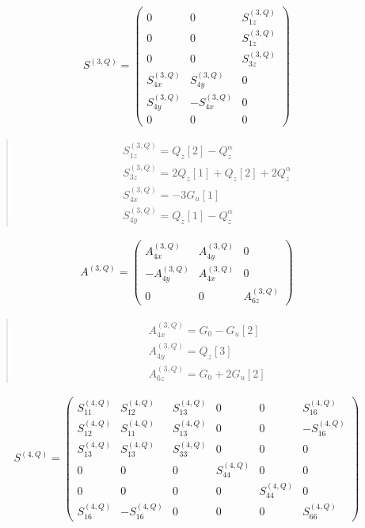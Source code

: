 \documentclass[fleqn,10pt]{jsarticle}
\begin{document}
\begin{align*}
S^{(3,Q)} = \begin{pmatrix} 0 & 0 & S^{(3,Q)}_{1z} \\ 0 & 0 & S^{(3,Q)}_{1z} \\ 0 & 0 & S^{(3,Q)}_{3z} \\ S^{(3,Q)}_{4x} & S^{(3,Q)}_{4y} & 0 \\ S^{(3,Q)}_{4y} & - S^{(3,Q)}_{4x} & 0 \\ 0 & 0 & 0 \end{pmatrix}
\end{align*}
\begin{quote}
\begin{align*}
& S^{(3,Q)}_{1z} = Q_{z}[2] - Q_{z}^{\alpha} \\
& S^{(3,Q)}_{3z} = 2 Q_{z}[1] + Q_{z}[2] + 2 Q_{z}^{\alpha} \\
& S^{(3,Q)}_{4x} = - 3 G_{u}[1] \\
& S^{(3,Q)}_{4y} = Q_{z}[1] - Q_{z}^{\alpha}
\end{align*}
\end{quote}
\begin{align*}
A^{(3,Q)} = \begin{pmatrix} A^{(3,Q)}_{4x} & A^{(3,Q)}_{4y} & 0 \\ - A^{(3,Q)}_{4y} & A^{(3,Q)}_{4x} & 0 \\ 0 & 0 & A^{(3,Q)}_{6z} \end{pmatrix}
\end{align*}
\begin{quote}
\begin{align*}
& A^{(3,Q)}_{4x} = G_{0} - G_{u}[2] \\
& A^{(3,Q)}_{4y} = Q_{z}[3] \\
& A^{(3,Q)}_{6z} = G_{0} + 2 G_{u}[2]
\end{align*}
\end{quote}
\begin{align*}
S^{(4,Q)} = \begin{pmatrix} S^{(4,Q)}_{11} & S^{(4,Q)}_{12} & S^{(4,Q)}_{13} & 0 & 0 & S^{(4,Q)}_{16} \\ S^{(4,Q)}_{12} & S^{(4,Q)}_{11} & S^{(4,Q)}_{13} & 0 & 0 & - S^{(4,Q)}_{16} \\ S^{(4,Q)}_{13} & S^{(4,Q)}_{13} & S^{(4,Q)}_{33} & 0 & 0 & 0 \\ 0 & 0 & 0 & S^{(4,Q)}_{44} & 0 & 0 \\ 0 & 0 & 0 & 0 & S^{(4,Q)}_{44} & 0 \\ S^{(4,Q)}_{16} & - S^{(4,Q)}_{16} & 0 & 0 & 0 & S^{(4,Q)}_{66} \end{pmatrix}
\end{align*}
\end{document}
